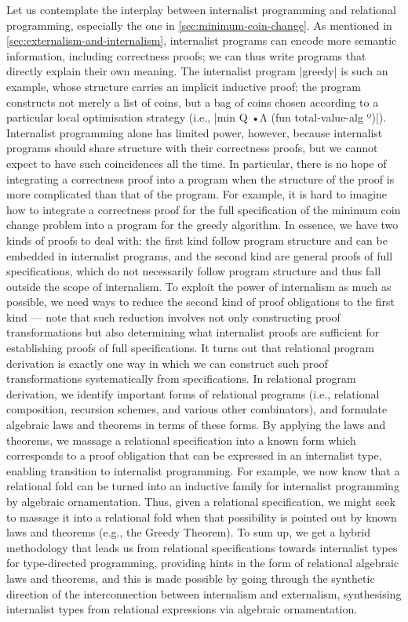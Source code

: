 Let us contemplate the interplay between internalist programming and relational programming, especially the one in \autoref{sec:minimum-coin-change}.
As mentioned in \autoref{sec:externalism-and-internalism}, internalist programs can encode more semantic information, including correctness proofs; we can thus write programs that directly explain their own meaning.
The internalist program |greedy| is such an example, whose structure carries an implicit inductive proof; the program constructs not merely a list of coins, but a bag of coins chosen according to a particular local optimisation strategy (i.e., |min Q •Λ (fun total-value-alg º)|).
Internalist programming alone has limited power, however, because internalist programs should share structure with their correctness proofs, but we cannot expect to have such coincidences all the time.
In particular, there is no hope of integrating a correctness proof into a program when the structure of the proof is more complicated than that of the program.
For example, it is hard to imagine how to integrate a correctness proof for the full specification of the minimum coin change problem into a program for the greedy algorithm.
In essence, we have two kinds of proofs to deal with: the first kind follow program structure and can be embedded in internalist programs, and the second kind are general proofs of full specifications, which do not necessarily follow program structure and thus fall outside the scope of internalism.
To exploit the power of internalism as much as possible, we need ways to reduce the second kind of proof obligations to the first kind --- note that such reduction involves not only constructing proof transformations but also determining what internalist proofs are sufficient for establishing proofs of full specifications.
It turns out that relational program derivation is exactly one way in which we can construct such proof transformations systematically from specifications.
In relational program derivation, we identify important forms of relational programs (i.e., relational composition, recursion schemes, and various other combinators), and formulate algebraic laws and theorems in terms of these forms.
By applying the laws and theorems, we massage a relational specification into a known form which corresponds to a proof obligation that can be expressed in an internalist type, enabling transition to internalist programming.
For example, we now know that a relational fold can be turned into an inductive family for internalist programming by algebraic ornamentation.
Thus, given a relational specification, we might seek to massage it into a relational fold when that possibility is pointed out by known laws and theorems (e.g., the Greedy Theorem).
To sum up, we get a hybrid methodology that leads us from relational specifications towards internalist types for type-directed programming, providing hints in the form of relational algebraic laws and theorems, and this is made possible by going through the synthetic direction of the interconnection between internalism and externalism, synthesising internalist types from relational expressions via algebraic ornamentation.

